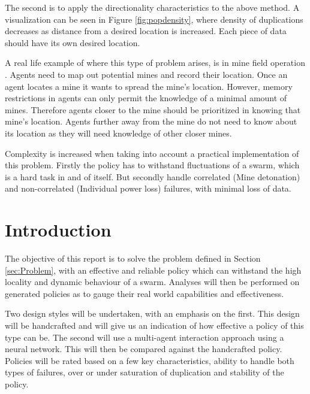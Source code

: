 \documentclass{UoYCSproject}
\begin{document}
The second is to apply the directionality characteristics to the above method.
A visualization can be seen in Figure \ref{fig:popdensity}, where density of duplications decreases as distance from a desired location is increased. 
Each piece of data should have its own desired location.

A real life example of where this type of problem arises, is in mine field operation \cite{Cognitive maps mine detection}.
Agents need to map out potential mines and record their location.
Once an agent locates a mine it wants to spread the mine’s location.
However, memory restrictions in agents can only permit the knowledge of a minimal amount of mines. 
Therefore agents closer to the mine should be prioritized in knowing that mine’s location.
Agents further away from the mine do not need to know about its location as they will need knowledge of other closer mines.

Complexity is increased when taking into account a practical implementation of this problem. 
Firstly the policy has to withstand fluctuations of a swarm, which is a hard task in and of itself.
But secondly handle correlated (Mine detonation) and non-correlated (Individual power loss) failures, with minimal loss of data.




\section{Introduction}
\label{sec:Introduction}

The objective of this report is to solve the problem defined in Section \ref{sec:Problem}, with an effective and reliable policy which can withstand the high locality and dynamic behaviour of a swarm. 
Analyses will then be performed on generated policies as to gauge their real world capabilities and effectiveness.

Two design styles will be undertaken, with an emphasis on the first.
This design will be handcrafted and will give us an indication of how effective a policy of this type can be.
The second will use a multi-agent interaction approach using a neural network. 
This will then be compared against the handcrafted policy.
Policies will be rated based on a few key characteristics, ability to handle both types of failures, over or under saturation of duplication and stability of the policy.
\end{document}
